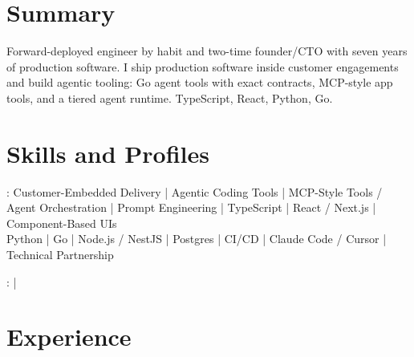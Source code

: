 \documentclass[print]{jack-resume}
\begin{document}
\pagecolor{darkmodeBackground}


\begin{minipage}[t][1cm][t]{.03\textwidth}
    \hfill
\end{minipage}

\section{Summary}
Forward-deployed engineer by habit and two-time founder/CTO with seven years of production software. I ship production software inside customer engagements and build agentic tooling: Go agent tools with exact contracts, MCP-style app tools, and a tiered agent runtime. TypeScript, React, Python, Go.
\sectionsep

\section{Skills and Profiles}
:
Customer-Embedded Delivery \hfill | \hfill
Agentic Coding Tools \hfill | \hfill
MCP-Style Tools / Agent Orchestration \hfill | \hfill
Prompt Engineering \hfill | \hfill
TypeScript \hfill | \hfill
React / Next.js \hfill | \hfill
Component-Based UIs \\
\hspace{1.0cm} Python \hfill | \hfill
Go \hfill | \hfill
Node.js / NestJS \hfill | \hfill
Postgres \hfill | \hfill
CI/CD \hfill | \hfill
Claude Code / Cursor \hfill | \hfill
Technical Partnership \\

\raggedright{
    :
      \href{https://www.linkedin.com/in/jack-sturtevant/}{ \ExternalLink} |
     \href{https://github.com/jacksturt}{ \ExternalLink}}

\section{Experience}
\end{document}
